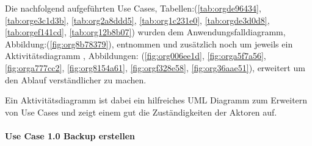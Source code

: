 Die nachfolgend aufgeführten Use Cases, Tabellen:(\ref{tab:orgde96434}, \ref{tab:orge3c1d3b},
\ref{tab:org2a8ddd5}, \ref{tab:org1c231e0}, \ref{tab:orgde3d0d8}, \ref{tab:orgef141cd}, \ref{tab:org12b8b07})
wurden dem Anwendungsfalldiagramm, Abbildung:(\ref{fig:org8b78379}), entnommen und
zusätzlich noch um jeweils ein Aktivitätsdiagramm , Abbildungen:
(\ref{fig:org006ee1d}, \ref{fig:orga5f7a56}, \ref{fig:orga777cc2},
\ref{fig:org8154a61}, \ref{fig:orgf328e58}, \ref{fig:org36aae51}), erweitert
um den Ablauf verständlicher zu machen.

Ein Aktivitätsdiagramm ist dabei ein hilfreiches UML Diagramm zum Erweitern von
Use Cases und zeigt einem gut die Zuständigkeiten der Aktoren auf.

\paragraph{Use Case 1.0 Backup erstellen}
\label{sec:org5587dbc}

